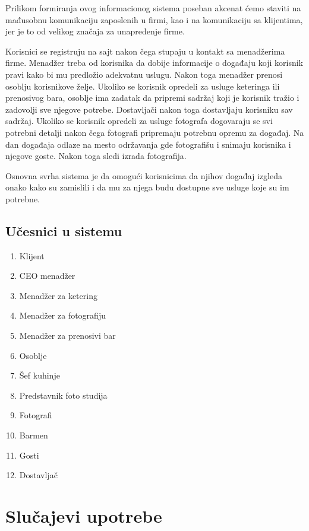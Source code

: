 \documentclass[a4paper]{article}
\begin{document}
Prilikom formiranja ovog informacionog sistema poseban akcenat ćemo staviti na mađusobnu komunikaciju zaposlenih u firmi, kao i na komunikaciju sa klijentima, jer je to od velikog značaja za unapređenje firme.
    
Korisnici se registruju na sajt nakon čega stupaju u kontakt sa menadžerima firme. Menadžer treba od korisnika da dobije informacije o događaju koji korisnik pravi kako bi mu predložio adekvatnu uslugu. Nakon toga menadžer prenosi osoblju korisnikove želje. 
Ukoliko se korisnik opredeli za usluge keteringa ili prenosivog bara, osoblje ima zadatak da pripremi sadržaj koji je korisnik tražio i zadovolji sve njegove potrebe. Dostavljači nakon toga dostavljaju korisniku sav sadržaj.
Ukoliko se korisnik opredeli za usluge fotografa dogovaraju se svi potrebni detalji nakon čega fotografi pripremaju potrebnu opremu za događaj. Na dan događaja odlaze na mesto održavanja gde fotografišu i snimaju korisnika i njegove goste. Nakon toga sledi izrada fotografija. 
    
Osnovna svrha sistema je da omogući korisnicima da njihov događaj izgleda onako kako su zamislili i da mu za njega budu dostupne sve usluge koje su im potrebne. 
    
    \subsection{Učesnici u sistemu}
    
    \begin{enumerate}
        \item Klijent
        \item CEO menadžer
        \item Menadžer za ketering
        \item Menadžer za fotografiju
        \item Menadžer za prenosivi bar
        \item Osoblje
        \item Šef kuhinje
        \item Predstavnik foto studija
        \item Fotografi
        \item Barmen
        \item Gosti
        \item Dostavljač
    \end{enumerate}
    
    
\section{Slučajevi upotrebe}
\end{document}
